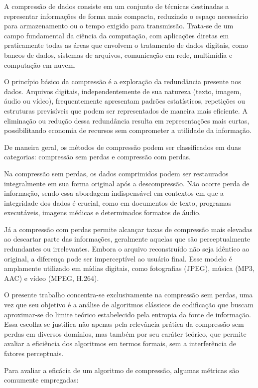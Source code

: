 A compressão de dados consiste em um conjunto de técnicas destinadas a representar informações de forma mais compacta, reduzindo o espaço necessário para armazenamento ou o tempo exigido para transmissão. Trata-se de um campo fundamental da ciência da computação, com aplicações diretas em praticamente todas as áreas que envolvem o tratamento de dados digitais, como bancos de dados, sistemas de arquivos, comunicação em rede, multimídia e computação em nuvem.

O princípio básico da compressão é a exploração da redundância presente nos dados. Arquivos digitais, independentemente de sua natureza (texto, imagem, áudio ou vídeo), frequentemente apresentam padrões estatísticos, repetições ou estruturas previsíveis que podem ser representados de maneira mais eficiente. A eliminação ou redução dessa redundância resulta em representações mais curtas, possibilitando economia de recursos sem comprometer a utilidade da informação.

De maneira geral, os métodos de compressão podem ser classificados em duas categorias: compressão sem perdas e compressão com perdas. 

Na compressão sem perdas, os dados comprimidos podem ser restaurados integralmente em sua forma original após a descompressão. Não ocorre perda de informação, sendo essa abordagem indispensável em contextos em que a integridade dos dados é crucial, como em documentos de texto, programas executáveis, imagens médicas e determinados formatos de áudio. 

Já a compressão com perdas permite alcançar taxas de compressão mais elevadas ao descartar parte das informações, geralmente aquelas que são perceptualmente redundantes ou irrelevantes. Embora o arquivo reconstruído não seja idêntico ao original, a diferença pode ser imperceptível ao usuário final. Esse modelo é amplamente utilizado em mídias digitais, como fotografias (JPEG), música (MP3, AAC) e vídeo (MPEG, H.264).

O presente trabalho concentra-se exclusivamente na compressão sem perdas, uma vez que seu objetivo é a análise de algoritmos clássicos de codificação que buscam aproximar-se do limite teórico estabelecido pela entropia da fonte de informação. Essa escolha se justifica não apenas pela relevância prática da compressão sem perdas em diversos domínios, mas também por seu caráter teórico, que permite avaliar a eficiência dos algoritmos em termos formais, sem a interferência de fatores perceptuais.

Para avaliar a eficácia de um algoritmo de compressão, algumas métricas são comumente empregadas:

